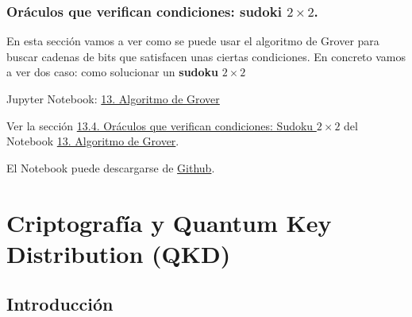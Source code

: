 \documentclass[a4paper,11pt]{book} %
\numberwithin{equation}{chapter}
\begin{document}
\subsection{Oráculos que verifican condiciones: sudoki $2 \times 2$.}

En esta sección vamos a ver como se puede usar el algoritmo de Grover para buscar cadenas de bits que satisfacen unas ciertas condiciones. En concreto vamos a ver dos caso: como solucionar un \textbf{sudoku} $2 \times 2$



    \begin{mybox_orange}{Jupyter Notebook: \href{https://www.scbi.uma.es/web/wp-content/uploads/Jupyterbook/CICC_UMA/Notebooks/html/docs/Part_01/Chapter_13-Grover_Algorithm_myst.html}{13. Algoritmo de Grover}}
  
   Ver la sección \href{https://www.scbi.uma.es/web/wp-content/uploads/Jupyterbook/CICC_UMA/Notebooks/html/docs/Part_01/Chapter_13-Grover_Algorithm_myst.html#oraculos-que-verifican-condiciones-sudoku-2-times-2}{13.4. Oráculos que verifican condiciones: Sudoku $2 \times 2$} del  Notebook \href{https://www.scbi.uma.es/web/wp-content/uploads/Jupyterbook/CICC_UMA/Notebooks/html/docs/Part_01/Chapter_13-Grover_Algorithm_myst.html}{13. Algoritmo de Grover}. 
    
  	El Notebook puede descargarse de \href{https://github.com/davidcb98/CICC_UMA/blob/master/Notebooks/Part_01/Chapter_13-Grover_Algorithm.ipynb}{Github}.
    \end{mybox_orange}








\chapter{Criptografía y Quantum Key Distribution (QKD)} \label{sec_chapter_QKD}


\section{Introducción}
\end{document}

